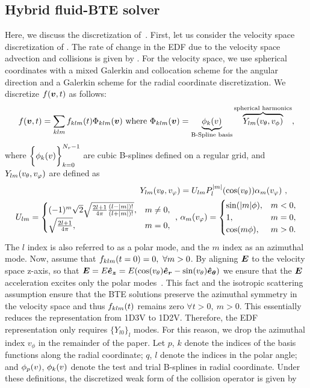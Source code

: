 \subsection{Hybrid fluid-BTE solver}
\label{subsec:pde_solver}
Here, we discuss the discretization of~. First, let us consider the velocity space discretization of . The rate of change in the EDF due to the velocity space advection and collisions is given by . For the velocity space, we use spherical coordinates with a mixed Galerkin and collocation scheme for the angular direction and a Galerkin scheme for the radial coordinate discretization. We discretize $f(\boldsymbol{v}, t)$ as follows:
\begin{equation}
	f(\vect{v}, t) = \sum_{klm} f_{klm}\of{t} \Phi_{klm}\of{\vect{v}} \text{ where } \Phi_{klm}\of{\vect{v}}  = \underbrace{\phi_k\of{v}}_{\text{B-Spline basis}} \overbrace{Y_{lm}\of{v_\theta, v_\phi}}^{\tiny\text{spherical harmonics}}, \label{eq:f_expansion}
\end{equation} where $\biggl\{\phi_{k}\of{v}\biggr\}_{k=0}^{N_r-1}$ are cubic B-splines defined on a regular grid, and $Y_{lm}\of{\vtheta, \vphi}$ are defined as 
\begin{align}
	Y_{lm}\of{\vtheta,\vphi} &= U_{lm} P^{|m|}_l\of{\cos\of{\vtheta}} \alpha_m\of{\vphi} \text{ , } \nonumber \\
	U_{lm} = 
	\begin{cases}
		(-1)^m \sqrt{2} \sqrt{\frac{2l+1}{4\pi} \frac{(l-|m|)!}{(l+|m|)!}}, &m\neq 0, \\
		\sqrt{\frac{2l+1}{4\pi}}, &m = 0,
	\end{cases} \text{ , } &
	\alpha_m\of{\vphi}  =
	\begin{cases}
		\sin\of{|m|\phi}, &m < 0, \\
		1, &m = 0,\\
		\cos\of{m\phi}, &m > 0.
	\end{cases} \label{eq:sph_harmonics}
\end{align}
The $l$ index is also referred to as a polar mode, and the $m$ index as an azimuthal mode. Now, assume that $f_{klm}\of{t=0}=0,\  \forall m>0$. By aligning $\boldsymbol{E}$ to the velocity space z-axis, so that $\vect{E} = E \vect{\hat{e}_z} =  E \of{\cos(\vtheta) \vect{\hat{e}_r} - \sin(\vtheta)\vect{\hat{e}_\theta}}$ we ensure that the $\boldsymbol{E}$ acceleration excites only the polar modes~. This fact and the isotropic scattering assumption ensure that the BTE solutions preserve the azimuthal symmetry in the velocity space and thus $f_{klm}\of{t}$ remains zero $\forall t>0,\ m>0$. This essentially reduces the representation from 1D3V to 1D2V. Therefore, the EDF representation only requires $\{Y_{l0}\}_{l}$ modes. For this reason, we drop the azimuthal index $v_{\phi}$ in the remainder of the paper. Let $p$, $k$ denote the indices of the basis functions along the radial coordinate; $q$, $l$ denote the indices in the polar angle; and $\phi_p\of{v}$, $\phi_k\of{v}$ denote the test and trial B-splines in radial coordinate. Under these definitions, the discretized weak form of the collision operator is given by


